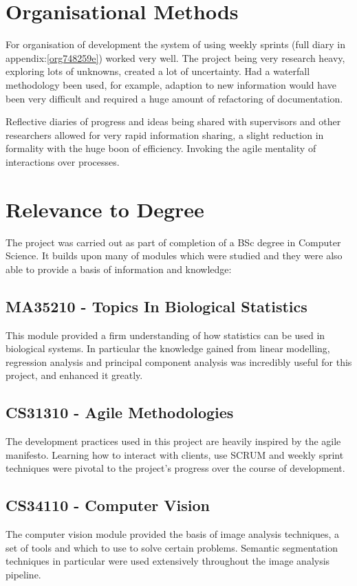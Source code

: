 \documentclass[11pt]{report}
\begin{document}
\section{Organisational Methods}
\label{sec:org7087059}
For organisation of development the system of using weekly sprints (full diary in appendix:\ref{org748259e}) worked very well. The project being very research heavy, exploring lots of unknowns, created a lot of uncertainty. Had a waterfall methodology been used, for example, adaption to new information would have been very difficult and required a huge amount of refactoring of documentation.

Reflective diaries of progress and ideas being shared with supervisors and other researchers allowed for very rapid information sharing, a slight reduction in formality with the huge boon of efficiency. Invoking the agile mentality of interactions over processes.

\section{Relevance to Degree}
\label{sec:org4fecc99}
The project was carried out as part of completion of a BSc degree in Computer Science. It builds upon many of modules which were studied and they were also able to provide a basis of information and knowledge:

\subsection{MA35210 - Topics In Biological Statistics}
\label{sec:org0343fd7}
This module provided a firm understanding of how statistics can be used in biological systems. In particular the knowledge gained from linear modelling, regression analysis and principal component analysis was incredibly useful for this project, and enhanced it greatly.
\subsection{CS31310 - Agile Methodologies}
\label{sec:org0f3396b}
The development practices used in this project are heavily inspired by the agile manifesto. Learning how to interact with clients, use SCRUM and weekly sprint techniques were pivotal to the project's progress over the course of development.
\subsection{CS34110 - Computer Vision}
\label{sec:org81e6e09}
The computer vision module provided the basis of image analysis techniques, a set of tools and which to use to solve certain problems. Semantic segmentation techniques in particular were used extensively throughout the image analysis pipeline.
\end{document}
